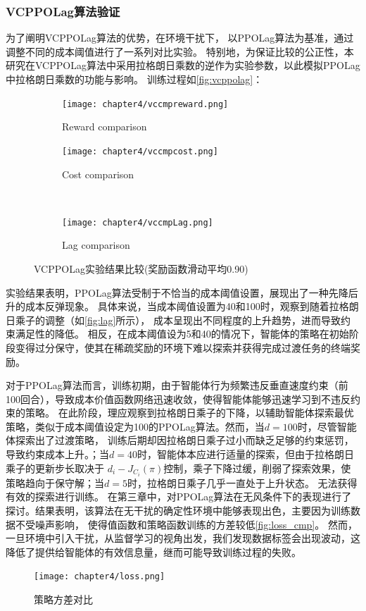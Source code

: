 \subsubsection{VCPPOLag算法验证}
为了阐明VCPPOLag算法的优势，在环境干扰下，
以PPOLag算法为基准，通过调整不同的成本阈值进行了一系列对比实验。
特别地，为保证比较的公正性，本研究在VCPPOLag算法中采用拉格朗日乘数的逆作为实验参数，以此模拟PPOLag中拉格朗日乘数的功能与影响。
训练过程如\autoref{fig:vcppolag}：
\begin{figure}[H]
    \centering
    \begin{subfigure}{.45\textwidth}
        \centering
        \texttt{[image: chapter4/vccmpreward.png]}
        \caption{Reward comparison}
        \label{fig:reward}
    \end{subfigure}%
    \hfill %
    \begin{subfigure}{.45\textwidth}
        \centering
        \texttt{[image: chapter4/vccmpcost.png]}
        \caption{Cost comparison}
        \label{fig:cost}
    \end{subfigure}
    \\
    \begin{subfigure}{.55\textwidth}
        \centering
        \texttt{[image: chapter4/vccmpLag.png]}
        \caption{Lag comparison}
        \label{fig:lag}
    \end{subfigure}
    \caption{VCPPOLag实验结果比较(奖励函数滑动平均0.90)}
    \label{fig:vcppolag}
\end{figure}
实验结果表明，PPOLag算法受制于不恰当的成本阈值设置，展现出了一种先降后升的成本反弹现象。
具体来说，当成本阈值设置为40和100时，观察到随着拉格朗日乘子的调整（如\autoref{fig:lag}所示），
成本呈现出不同程度的上升趋势，进而导致约束满足性的降低。
相反，在成本阈值设为5和40的情况下，智能体的策略在初始阶段变得过分保守，使其在稀疏奖励的环境下难以探索并获得完成过渡任务的终端奖励。

对于PPOLag算法而言，训练初期，由于智能体行为频繁违反垂直速度约束（前100回合），导致成本价值函数网络迅速收敛，使得智能体能够迅速学习到不违反约束的策略。
在此阶段，理应观察到拉格朗日乘子的下降，以辅助智能体探索最优策略，类似于成本阈值设定为100的PPOLag算法。然而，当$d=100$时，尽管智能体探索出了过渡策略，
训练后期却因拉格朗日乘子过小而缺乏足够的约束惩罚，导致约束成本上升。；当$d=40$时，智能体本应进行适量的探索，但由于拉格朗日乘子的更新步长取决于
$d_{i}-J_{C_{i}}(\pi)$控制，乘子下降过缓，削弱了探索效果，使策略趋向于保守解；当$d=5$时，拉格朗日乘子几乎一直处于上升状态。
无法获得有效的探索进行训练。
在第三章中，对PPOLag算法在无风条件下的表现进行了探讨。结果表明，该算法在无干扰的确定性环境中能够表现出色，主要因为训练数据不受噪声影响，
使得值函数和策略函数训练的方差较低\autoref{fig:loss_cmp}。
然而，一旦环境中引入干扰，从监督学习的视角出发，我们发现数据标签会出现波动，这降低了提供给智能体的有效信息量，继而可能导致训练过程的失败。
\begin{figure}[htbp]
    \centering
    \texttt{[image: chapter4/loss.png]}
    \caption{\label{fig:loss_cmp}策略方差对比}
\end{figure}

